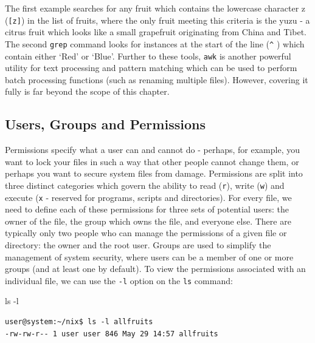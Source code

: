\documentclass[11pt]{article}
\begin{document}
The first example searches for any fruit which contains the lowercase character z (\texttt{[z]})  in the list of fruits, where the only fruit meeting this criteria is the yuzu - a citrus fruit which looks like a small grapefruit originating from China and Tibet. The second \texttt{grep} command looks for instances at the start of the line (\texttt{\^}{ } ) which contain either `Red' or `Blue'.  Further to these tools, \texttt{awk} is another powerful utility for text processing and pattern matching which can be used to perform batch processing functions (such as renaming multiple files). However, covering it fully is far beyond the scope of this chapter.
\subsection{Users, Groups and Permissions}

Permissions  specify what a user can and cannot do - perhaps, for example, you want to lock your files in such a way that other people cannot change them, or perhaps you want to secure system files from damage. Permissions are split into three distinct categories which govern the ability to read (\texttt{r}), write (\texttt{w}) and execute (\texttt{x} - reserved for programs, scripts and directories). For every file, we need to define each of these permissions for three sets of potential users: the owner of the file, the group which owns the file, and everyone else. There are typically only two people who can manage the permissions of a given file or directory: the owner and the root user. Groups are used to simplify the management of system security, where users can be a member of one or more groups (and at least one by default). To view the permissions associated with an individual file, we can use the \texttt{-l} option on the \texttt{ls} command:\\

\begin{listing}[H]
\caption{ls -l}\vspace{-0.1in}
\begin{verbatim}
user@system:~/nix$ ls -l allfruits
-rw-rw-r-- 1 user user 846 May 29 14:57 allfruits
\end{verbatim}
\end{listing}
\end{document}

